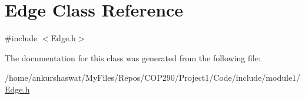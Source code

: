 \hypertarget{classEdge}{}\section{Edge Class Reference}
\label{classEdge}


{\ttfamily \#include $<$Edge.\+h$>$}



The documentation for this class was generated from the following file\+:\begin{DoxyCompactItemize}
\item 
/home/ankurshaswat/\+My\+Files/\+Repos/\+C\+O\+P290/\+Project1/\+Code/include/module1/\hyperlink{Edge_8h}{Edge.\+h}\end{DoxyCompactItemize}
